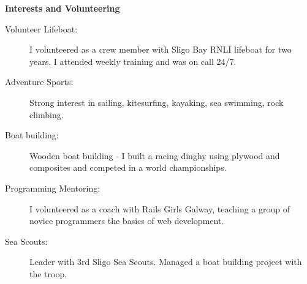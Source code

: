\documentclass[letterpaper,11pt]{article}
\newcommand{\resheading}[1]{{\large \colorbox{mygrey}{\begin{minipage}{\textwidth}{\textbf{#1 \vphantom{p\^{E}}}}\end{minipage}}}}
\begin{document}
\resheading{Interests and Volunteering}
	\begin{description}
		\item[Volunteer Lifeboat:] I volunteered as a crew member with Sligo Bay RNLI lifeboat for two years. I attended weekly training and was on call 24/7.
		\item[Adventure Sports:] Strong interest in sailing, kitesurfing, kayaking, sea swimming, rock climbing.
		\item[Boat building:] Wooden boat building - I built a racing dinghy using plywood and composites and competed in a world championships.
		\item[Programming Mentoring:] I volunteered as a coach with Rails Girls Galway, teaching a group of novice programmers the basics of web development.
		\item[Sea Scouts:] Leader with 3rd Sligo Sea Scouts. Managed a boat building project with the troop.

	\end{description} %
\end{document}
